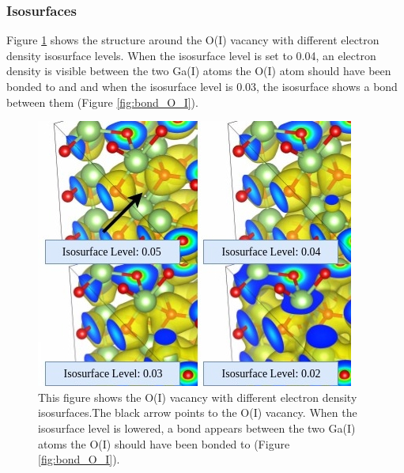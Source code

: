 \subsubsection{Isosurfaces}

Figure \ref{fig:isosurface_O_I} shows the structure around the O(I) vacancy with different electron density isosurface levels. When the isosurface level is set to 0.04, an electron density is visible between the two Ga(I) atoms the O(I) atom should have been bonded to and and when the isosurface level is 0.03, the isosurface shows a bond between them (Figure \ref{fig:bond_O_I}).

\begin{figure}[H]
\includegraphics[width=0.9\linewidth]{../fig/isosurfaces/O_I/isosurface}\caption{This figure shows the O(I) vacancy with different electron density isosurfaces.The black arrow points to the O(I) vacancy. When the isosurface level is lowered, a bond appears between the two Ga(I) atoms the O(I) should have been bonded to (Figure \ref{fig:bond_O_I}).}\label{fig:isosurface_O_I}
\end{figure}

